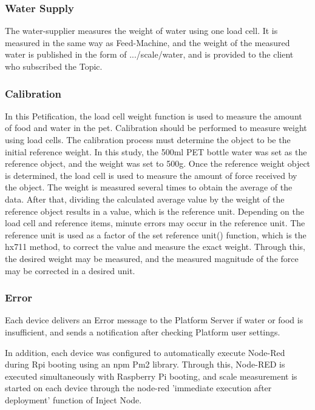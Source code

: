 \documentclass[conference]{IEEEtran}
\begin{document}
\subsubsection{Water Supply}
The water-supplier measures the weight of water using one load cell. It is measured in the same way as Feed-Machine, and the weight of the measured water is published in the form of .../scale/water, and is provided to the client who subscribed the Topic.

\subsubsection{Calibration}
In this Petification, the load cell weight function is used to measure the amount of food and water in the pet. 
Calibration should be performed to measure weight using load cells. 
The calibration process must determine the object to be the initial reference weight. 
In this study, the 500ml PET bottle water was set as the reference object, and the weight was set to 500g.
Once the reference weight object is determined, the load cell is used to measure the amount of force received by the object. The weight is measured several times to obtain the average of the data. 
After that, dividing the calculated average value by the weight of the reference object results in a value, which is the reference unit.
Depending on the load cell and reference items, minute errors may occur in the reference unit. The reference unit is used as a factor of the set reference unit() function, which is the hx711 method, to correct the value and measure the exact weight. 
Through this, the desired weight may be measured, and the measured magnitude of the force may be corrected in a desired unit.

\subsubsection{Error}
Each device delivers an Error message to the Platform Server if water or food is insufficient, and sends a notification after checking Platform user settings. 

In addition, each device was configured to automatically execute Node-Red during Rpi booting using an npm Pm2 library. 
Through this, Node-RED is executed simultaneously with Raspberry Pi booting, and scale measurement is started on each device through the node-red 'immediate execution after deployment' function of Inject Node.
\end{document}
